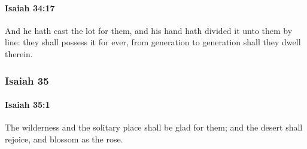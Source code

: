 		\paragraph{Isaiah 34:17} %
			\label{ISAIAH-34-17}

			And he hath cast the lot for them, and his hand hath divided it unto them by line: they shall possess it for ever, from generation to generation shall they dwell therein.

	\subsubsection{Isaiah 35} %
		\label{ISAIAH-35}

		\paragraph{Isaiah 35:1} %
			\label{ISAIAH-35-1}

			The wilderness and the solitary place shall be glad for them; and the desert shall rejoice, and blossom as the rose.

